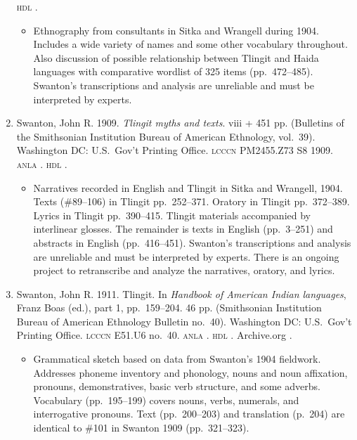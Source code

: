 \documentclass[12pt,letterpaper,oneside,article]{memoir}
\begin{document}
\begin{enumerate}
	\textsc{hdl} .
	\begin{itemize}
	\item	Ethnography from consultants in Sitka and Wrangell during 1904.
		Includes a wide variety of names and some other vocabulary throughout.
		Also discussion of possible relationship between Tlingit and Haida languages
		with comparative wordlist of 325 items (pp.\ 472–485).
		Swanton’s transcriptions and analysis are unreliable and must be interpreted
		by experts.
	\end{itemize}
\item	Swanton, John R.
	1909.
	\textit{Tlingit myths and texts}.
	viii + 451 pp.
	(Bulletins of the Smithsonian Institution Bureau of American Ethnology, vol.\ 39).
	Washington DC: U.S.\ Gov’t Printing Office.
	\textsc{lcccn} PM2455.Z73 S8 1909.
	\textsc{anla} .
	\textsc{hdl} .
	\begin{itemize}
	\item	Narratives recorded in English and Tlingit in Sitka and Wrangell, 1904.
		Texts (\#89–106) in Tlingit pp.\ 252–371.
		Oratory in Tlingit pp.\ 372–389.
		Lyrics in Tlingit pp.\ 390–415.
		Tlingit materials accompanied by interlinear glosses.
		The remainder is texts in English (pp.\ 3–251) and abstracts in English
		(pp.\ 416–451).
		Swanton’s transcriptions and analysis are unreliable and must be interpreted
		by experts.
		There is an ongoing project to retranscribe and analyze the narratives,
		oratory, and lyrics.
	\end{itemize}
\item	Swanton, John R.
	1911.
	Tlingit.
	In \textit{Handbook of American Indian languages}, Franz Boas (ed.),
	part 1, pp.\ 159–204.
	46 pp.
	(Smithsonian Institution Bureau of American Ethnology Bulletin no.\ 40).
	Washington DC: U.S.\ Gov’t Printing Office.
	\textsc{lcccn} E51.U6 no.\ 40.
	\textsc{anla} .
	\textsc{hdl} .
	Archive.org .
	\begin{itemize}
	\item	Grammatical sketch based on data from Swanton’s 1904 fieldwork.
		Addresses phoneme inventory and phonology, nouns and noun affixation,
		pronouns, demonstratives, basic verb structure, and some adverbs.
		Vocabulary (pp.\ 195–199) covers nouns, verbs, numerals, and interrogative
		pronouns.
		Text (pp.\ 200–203) and translation (p.\ 204) are identical to \#101 in
		Swanton 1909 (pp.\ 321–323).

\end{itemize}
\end{enumerate}
\end{document}
